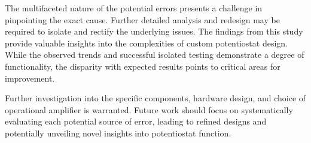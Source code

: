 \documentclass{article}
\begin{document}
The multifaceted nature of the potential errors presents a challenge in pinpointing the exact cause. Further detailed analysis and redesign may be required to isolate and rectify the underlying issues. The findings from this study provide valuable insights into the complexities of custom potentiostat design. While the observed trends and successful isolated testing demonstrate a degree of functionality, the disparity with expected results points to critical areas for improvement.

Further investigation into the specific components, hardware design, and choice of operational amplifier is warranted. Future work should focus on systematically evaluating each potential source of error, leading to refined designs and potentially unveiling novel insights into potentiostat function.
\end{document}
